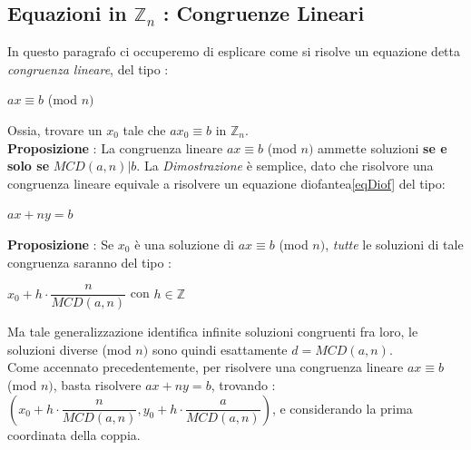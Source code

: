 \documentclass[12pt, letterpaper]{article}
\begin{document}
\subsection{Equazioni in \(\mathbb{Z}_n\) : Congruenze Lineari}
In questo paragrafo ci occuperemo di esplicare come si risolve un equazione detta \textit{congruenza lineare}, del tipo :\begin{center}
    \(ax\equiv b\)  (mod \(n)\)
\end{center}
Ossia, trovare un \(x_0\) tale che \(ax_0\equiv b\) in \(\mathbb{Z}_n\).
\\\textbf{Proposizione} : La congruenza lineare \(ax\equiv b\)  (mod \(n)\) ammette soluzioni \textbf{se e solo se} \(MCD(a,n)|b\). La \textit{Dimostrazione}
 è semplice, dato che risolvore una congruenza lineare equivale a risolvere un equazione diofantea\ref{eqDiof} 
 del tipo:\begin{center}
    \(ax+ny=b\)
 \end{center}
\textbf{Proposizione} : Se \(x_0\) è una soluzione di \(ax\equiv b\)  (mod \(n)\), \textit{tutte} le soluzioni di tale 
congruenza saranno del tipo :\begin{center}
    \(x_0+h\cdot \dfrac{n}{MCD(a,n)}\) con \(h\in \mathbb{Z}\)
\end{center}
Ma tale generalizzazione identifica infinite soluzioni congruenti fra loro, le soluzioni diverse (mod \(n)\) sono 
quindi esattamente \(d=MCD(a,n)\).\\Come accennato precedentemente, per risolvere una congruenza lineare
\(ax\equiv b\)  (mod \(n)\), basta risolvere  \(ax+ny=b\), trovando : \((x_0+h\cdot \dfrac{n}{MCD(a,n)},y_0+h\cdot \dfrac{a}{MCD(a,n)})\), 
e considerando la prima coordinata della coppia.
\end{document}
